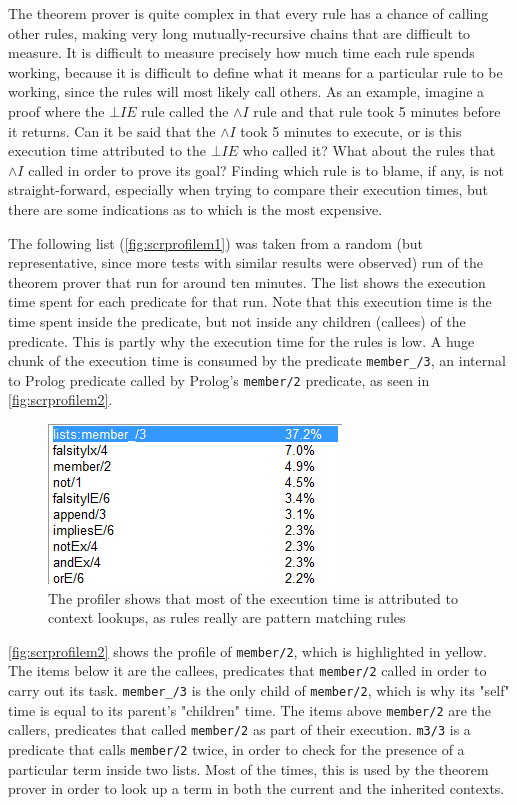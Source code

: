 \documentclass[11pt,twoside,a4paper]{report}
\begin{document}
The theorem prover is quite complex in that every rule has a chance of calling other rules, making very long mutually-recursive chains that are difficult to measure. It is difficult to measure precisely how much time each rule spends working, because it is difficult to define what it means for a particular rule to be working, since the rules will most likely call others. As an example, imagine a proof where the $\bot IE$ rule called the $\wedge I$ rule and that rule took 5 minutes before it returns. Can it be said that the $\wedge I$ took 5 minutes to execute, or is this execution time attributed to the $\bot IE$ who called it? What about the rules that $\wedge I$ called in order to prove its goal? Finding which rule is to blame, if any, is not straight-forward, especially when trying to compare their execution times, but there are some indications as to which is the most expensive.

The following list (\autoref{fig:scrprofilem1}) was taken from a random (but representative, since more tests with similar results were observed) run of the theorem prover that run for around ten minutes. The list shows the execution time spent for each predicate for that run. Note that this execution time is the time spent inside the predicate, but not inside any children (callees) of the predicate. This is partly why the execution time for the rules is low. A huge chunk of the execution time is consumed by the predicate \lstinline$member_/3$, an internal to Prolog predicate called by Prolog's \lstinline$member/2$ predicate, as seen in \autoref{fig:scrprofilem2}.

\begin{figure}[htp]
\centerline{\includegraphics[scale=0.75]{img/scr-profile-member1.png}}
\caption{The profiler shows that most of the execution time is attributed to context lookups, as rules really are pattern matching rules\label{fig:scrprofilem1}}
\end{figure}

\autoref{fig:scrprofilem2} shows the profile of \lstinline$member/2$, which is highlighted in yellow. The items below it are the callees, predicates that \lstinline$member/2$ called in order to carry out its task. \lstinline$member_/3$ is the only child of \lstinline$member/2$, which is why its "self" time is equal to its parent's "children" time. The items above \lstinline$member/2$ are the callers, predicates that called \lstinline$member/2$ as part of their execution. \lstinline$m3/3$ is a predicate that calls \lstinline$member/2$ twice, in order to check for the presence of a particular term inside two lists. Most of the times, this is used by the theorem prover in order to look up a term in both the current and the inherited contexts.
\end{document}

